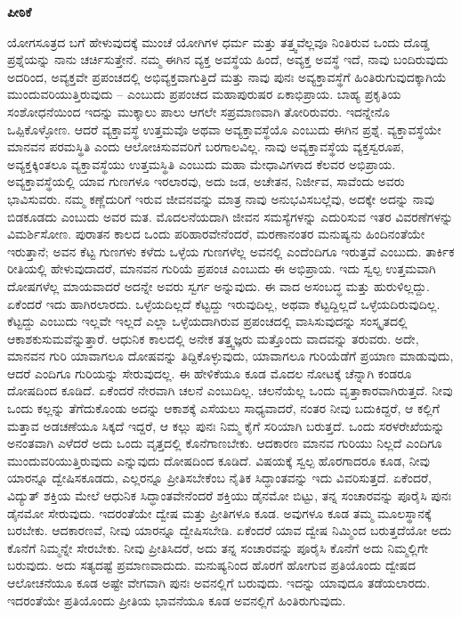 \begin{center}
{\LARGE \bf ಪೀಠಿಕೆ}
\end{center}
ಯೋಗಸೂತ್ರದ ಬಗೆ ಹೇಳುವುದಕ್ಕೆ ಮುಂಚೆ ಯೋಗಿಗಳ ಧರ್ಮ ಮತ್ತು ತತ್ತ್ವವೆಲ್ಲವೂ ನಿಂತಿರುವ ಒಂದು ದೊಡ್ಡ ಪ್ರಶ್ನೆಯನ್ನು ನಾನು ಚರ್ಚಿಸುತ್ತೇನೆ. ನಮ್ಮ ಈಗಿನ ವ್ಯಕ್ತ ಅವಸ್ಥೆಯ ಹಿಂದೆ, ಅವ್ಯಕ್ತ ಅವಸ್ಥೆ ಇದೆ, ನಾವು ಬಂದಿರುವುದು ಅದರಿಂದ, ಅವ್ಯಕ್ತವೇ ಪ್ರಪಂಚದಲ್ಲಿ ಅಭಿವ್ಯಕ್ತವಾಗುತ್ತಿದೆ ಮತ್ತು ನಾವು ಪುನಃ ಅವ್ಯಕ್ತಾವಸ್ಥೆಗೆ ಹಿಂತಿರುಗುವುದಕ್ಕಾಗಿಯೆ ಮುಂದುವರಿಯುತ್ತಿರುವುದು – ಎಂಬುದು ಪ್ರಪಂಚದ ಮಹಾಪುರುಷರ ಏಕಾಭಿಪ್ರಾಯ. ಬಾಹ್ಯ ಪ್ರಕೃತಿಯ ಸಂಶೋಧನೆಯಿಂದ ಇದನ್ನು ಮುಕ್ಕಾಲು ಪಾಲು ಆಗಲೇ ಸಪ್ರಮಾಣವಾಗಿ ತೋರಿರುವರು. ಇದನ್ನೇನೊ ಒಪ್ಪಿಕೊಳ್ಳೋಣ. ಆದರೆ ವ್ಯಕ್ತಾವಸ್ಥೆ ಉತ್ತಮವೊ ಅಥವಾ ಅವ್ಯಕ್ತಾವಸ್ಥೆಯೊ ಎಂಬುದು ಈಗಿನ ಪ್ರಶ್ನೆ. ವ್ಯಕ್ತಾವಸ್ಥೆಯೇ ಮಾನವನ ಪರಮಸ್ಥಿತಿ ಎಂದು ಆಲೋಚಿಸುವವರಿಗೆ ಬರಗಾಲವಿಲ್ಲ. ನಾವು ಅವ್ಯಕ್ತಾವಸ್ಥೆಯ ವ್ಯಕ್ತಸ್ವರೂಪ, ಅವ್ಯಕ್ತಕ್ಕಿಂತಲೂ ವ್ಯಕ್ತಾವಸ್ಥೆಯು ಉತ್ತಮಸ್ಥಿತಿ ಎಂಬುದು ಮಹಾ ಮೇಧಾವಿಗಳಾದ ಕೆಲವರ ಅಭಿಪ್ರಾಯ. ಅವ್ಯಕ್ತಾವಸ್ಥೆಯಲ್ಲಿ ಯಾವ ಗುಣಗಳೂ ಇರಲಾರವು, ಅದು ಜಡ, ಅಚೇತನ, ನಿರ್ಜೀವ, ಸಾವೆಂದು ಅವರು ಭಾವಿಸುವರು. ನಮ್ಮ ಕಣ್ಣೆದುರಿಗೆ ಇರುವ ಜೀವನವನ್ನು ಮಾತ್ರ ನಾವು ಅನುಭವಿಸಬಲ್ಲೆವು, ಅದಕ್ಕೇ ಅದನ್ನು ನಾವು ಬಿಡಕೂಡದು ಎಂಬುದು ಅವರ ಮತ. ಮೊದಲನೆಯದಾಗಿ ಜೀವನ ಸಮಸ್ಯೆಗಳನ್ನು ಎದುರಿಸುವ ಇತರ ವಿವರಣೆಗಳನ್ನು ವಿಮರ್ಶಿಸೋಣ. ಪುರಾತನ ಕಾಲದ ಒಂದು ಪರಿಹಾರವೇನೆಂದರೆ, ಮರಣಾನಂತರ ಮನುಷ್ಯನು ಹಿಂದಿನಂತೆಯೇ ಇರುತ್ತಾನೆ; ಅವನ ಕೆಟ್ಟ ಗುಣಗಳು ಕಳೆದು ಒಳ್ಳೆಯ ಗುಣಗಳೆಲ್ಲ ಅವನಲ್ಲಿ ಎಂದೆಂದಿಗೂ ಇರುತ್ತವೆ ಎಂಬುದು. ತಾರ್ಕಿಕ ರೀತಿಯಲ್ಲಿ ಹೇಳುವುದಾದರೆ, ಮಾನವನ ಗುರಿಯೆ ಪ್ರಪಂಚ ಎಂಬುದು ಈ ಅಭಿಪ್ರಾಯ. ಇದು ಸ್ವಲ್ಪ ಉತ್ತಮವಾಗಿ ದೋಷಗಳೆಲ್ಲ ಮಾಯವಾದರೆ ಅದನ್ನೇ ಅವರು ಸ್ವರ್ಗ ಅನ್ನುವುದು. ಈ ವಾದ ಅಸಂಬದ್ಧ ಮತ್ತು ಹುರುಳಿಲ್ಲದ್ದು. ಏಕೆಂದರೆ ಇದು ಹಾಗಿರಲಾರದು. ಒಳ್ಳೆಯದಿಲ್ಲದೆ ಕೆಟ್ಟದ್ದು ಇರುವುದಿಲ್ಲ, ಅಥವಾ ಕೆಟ್ಟದ್ದಿಲ್ಲದೆ ಒಳ್ಳೆಯದಿರುವುದಿಲ್ಲ. ಕೆಟ್ಟದ್ದು ಎಂಬುದು ಇಲ್ಲವೇ ಇಲ್ಲದೆ ಎಲ್ಲಾ ಒಳ್ಳೆಯದಾಗಿರುವ ಪ್ರಪಂಚದಲ್ಲಿ ವಾಸಿಸುವುದನ್ನು ಸಂಸ್ಕೃತದಲ್ಲಿ ಆಕಾಶಕುಸುಮವೆನ್ನುತ್ತಾರೆ. ಆಧುನಿಕ ಕಾಲದಲ್ಲಿ ಅನೇಕ ತತ್ತ್ವಜ್ಞರು ಮತ್ತೊಂದು ವಾದವನ್ನು ತರುವರು. ಅದೇ, ಮಾನವನ ಗುರಿ ಯಾವಾಗಲೂ ದೋಷವನ್ನು ತಿದ್ದಿಕೊಳ್ಳುವುದು, ಯಾವಾಗಲೂ ಗುರಿಯೆಡೆಗೆ ಪ್ರಯಾಣ ಮಾಡುವುದು, ಆದರೆ ಎಂದಿಗೂ ಗುರಿಯನ್ನು ಸೇರುವುದಲ್ಲ. ಈ ಹೇಳಿಕೆಯೂ ಕೂಡ ಮೊದಲ ನೋಟಕ್ಕೆ ಚೆನ್ನಾಗಿ ಕಂಡರೂ ದೋಷದಿಂದ ಕೂಡಿದೆ. ಏಕೆಂದರೆ ನೇರವಾಗಿ ಚಲನೆ ಎಂಬುದಿಲ್ಲ. ಚಲನೆಯೆಲ್ಲ ಒಂದು ವೃತ್ತಾಕಾರವಾಗಿರುತ್ತದೆ. ನೀವು ಒಂದು ಕಲ್ಲನ್ನು ತೆಗೆದುಕೊಂಡು ಅದನ್ನು ಆಕಾಶಕ್ಕೆ ಎಸೆಯಲು ಸಾಧ್ಯವಾದರೆ, ನಂತರ ನೀವು ಬದುಕಿದ್ದರೆ, ಆ ಕಲ್ಲಿಗೆ ಮತ್ತಾವ ಅಡಚಣೆಯೂ ಸಿಕ್ಕದೆ ಇದ್ದರೆ, ಆ ಕಲ್ಲು ಪುನಃ ನಿಮ್ಮ ಕೈಗೆ ಸರಿಯಾಗಿ ಬರುತ್ತದೆ. ಒಂದು ಸರಳರೇಖೆಯನ್ನು ಅನಂತವಾಗಿ ಎಳೆದರೆ ಅದು ಒಂದು ವೃತ್ತದಲ್ಲಿ ಕೊನೆಗಾಣಬೇಕು. ಆದಕಾರಣ ಮಾನವ ಗುರಿಯು ನಿಲ್ಲದೆ ಎಂದಿಗೂ ಮುಂದುವರಿಯುತ್ತಿರುವುದು ಎನ್ನುವುದು ದೋಷದಿಂದ ಕೂಡಿದೆ. ವಿಷಯಕ್ಕೆ ಸ್ವಲ್ಪ ಹೊರಗಾದರೂ ಕೂಡ, ನೀವು ಯಾರನ್ನೂ ದ್ವೇಷಿಸಕೂಡದು, ಎಲ್ಲರನ್ನೂ ಪ್ರೀತಿಸಬೇಕೆಂಬ ನೈತಿಕ ಸಿದ್ಧಾಂತವನ್ನು ಇದು ವಿವರಿಸುತ್ತದೆ. ಏಕೆಂದರೆ, ವಿದ್ಯುತ್​ ಶಕ್ತಿಯ ಮೇಲೆ ಆಧುನಿಕ ಸಿದ್ಧಾಂತವೇನೆಂದರೆ ಶಕ್ತಿಯು ಡೈನಮೋ ಬಿಟ್ಟು, ತನ್ನ ಸಂಚಾರವನ್ನು ಪೂರೈಸಿ ಪುನಃ ಡೈನಮೋ ಸೇರುವುದು. ಇದರಂತೆಯೇ ದ್ವೇಷ ಮತ್ತು ಪ್ರೀತಿಗಳೂ ಕೂಡ. ಅವುಗಳೂ ಕೂಡ ತಮ್ಮ ಮೂಲಸ್ಥಾನಕ್ಕೆ ಬರಬೇಕು. ಆದಕಾರಣವೆ, ನೀವು ಯಾರನ್ನೂ ದ್ವೇಷಿಸಬೇಡಿ. ಏಕೆಂದರೆ ಯಾವ ದ್ವೇಷ ನಿಮ್ಮಿಂದ ಬರುತ್ತದೆಯೋ ಅದು ಕೊನೆಗೆ ನಿಮ್ಮನ್ನೇ ಸೇರಬೇಕು. ನೀವು ಪ್ರೀತಿಸಿದರೆ, ಅದು ತನ್ನ ಸಂಚಾರವನ್ನು ಪೂರೈಸಿ ಕೊನೆಗೆ ಅದು ನಿಮ್ಮಲ್ಲಿಗೇ ಬರುವುದು. ಅದು ಸತ್ಯದಷ್ಟೆ ಪ್ರಮಾಣವಾದುದು. ಮನುಷ್ಯನಿಂದ ಹೊರಗೆ ಹೋಗುವ ಪ್ರತಿಯೊಂದು ದ್ವೇಷದ ಆಲೋಚನೆಯೂ ಕೂಡ ಅಷ್ಟೇ ವೇಗವಾಗಿ ಪುನಃ ಅವನಲ್ಲಿಗೆ ಬರುವುದು. ಇದನ್ನು ಯಾವುದೂ ತಡೆಯಲಾರದು. ಇದರಂತೆಯೇ ಪ್ರತಿಯೊಂದು ಪ್ರೀತಿಯ ಭಾವನೆಯೂ ಕೂಡ ಅವನಲ್ಲಿಗೆ ಹಿಂತಿರುಗುವುದು. 

